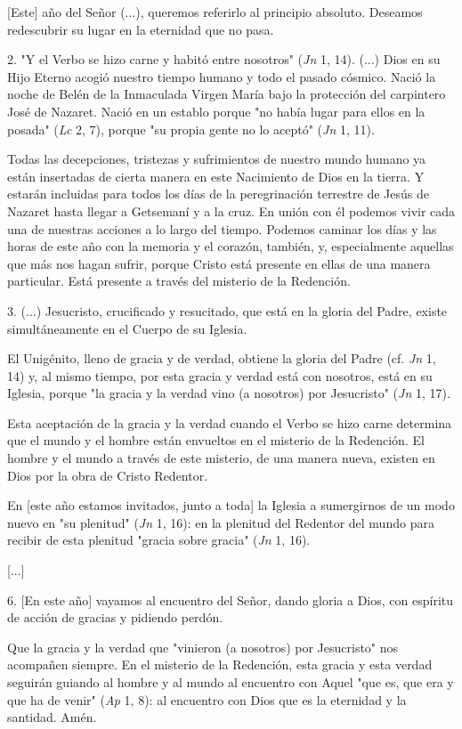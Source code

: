 \begin{body}
{[}Este{]} año del Señor (...), queremos referirlo al principio absoluto. Deseamos redescubrir su lugar en la eternidad que no pasa.

2. "Y el Verbo se hizo carne y habitó entre nosotros" (\emph{Jn} 1, 14). (...) Dios en su Hijo Eterno acogió nuestro tiempo humano y todo el pasado cósmico. Nació la noche de Belén de la Inmaculada Virgen María bajo la protección del carpintero José de Nazaret. Nació en un establo porque "no había lugar para ellos en la posada" (\emph{Lc} 2, 7), porque "su propia gente no lo aceptó" (\emph{Jn} 1, 11).

Todas las decepciones, tristezas y sufrimientos de nuestro mundo humano ya están insertadas de cierta manera en este Nacimiento de Dios en la tierra. Y estarán incluidas para todos los días de la peregrinación terrestre de Jesús de Nazaret hasta llegar a Getsemaní y a la cruz. En unión con él podemos vivir cada una de nuestras acciones a lo largo del tiempo. Podemos caminar los días y las horas de este año con la memoria y el corazón, también, y, especialmente aquellas que más nos hagan sufrir, porque Cristo está presente en ellas de una manera particular. Está presente a través del misterio de la Redención.

3. (...) Jesucristo, crucificado y resucitado, que está en la gloria del Padre, existe simultáneamente en el Cuerpo de su Iglesia.

El Unigénito, lleno de gracia y de verdad, obtiene la gloria del Padre (cf. \emph{Jn} 1, 14) y, al mismo tiempo, por esta gracia y verdad está con nosotros, está en su Iglesia, porque "la gracia y la verdad vino (a nosotros) por Jesucristo" (\emph{Jn} 1, 17).

Esta aceptación de la gracia y la verdad cuando el Verbo se hizo carne determina que el mundo y el hombre están envueltos en el misterio de la Redención. El hombre y el mundo a través de este misterio, de una manera nueva, existen en Dios por la obra de Cristo Redentor.

En {[}este año estamos invitados, junto a toda{]} la Iglesia a sumergirnos de un modo nuevo en "su plenitud" (\emph{Jn} 1, 16): en la plenitud del Redentor del mundo para recibir de esta plenitud "gracia sobre gracia" (\emph{Jn} 1, 16).

{[}...{]}

6. {[}En este año{]} vayamos al encuentro del Señor, dando gloria a Dios, con espíritu de acción de gracias y pidiendo perdón.

Que la gracia y la verdad que "vinieron (a nosotros) por Jesucristo" nos acompañen siempre. En el misterio de la Redención, esta gracia y esta verdad seguirán guiando al hombre y al mundo al encuentro con Aquel "que es, que era y que ha de venir" (\emph{Ap} 1, 8): al encuentro con Dios que es la eternidad y la santidad. Amén.


\end{body}
